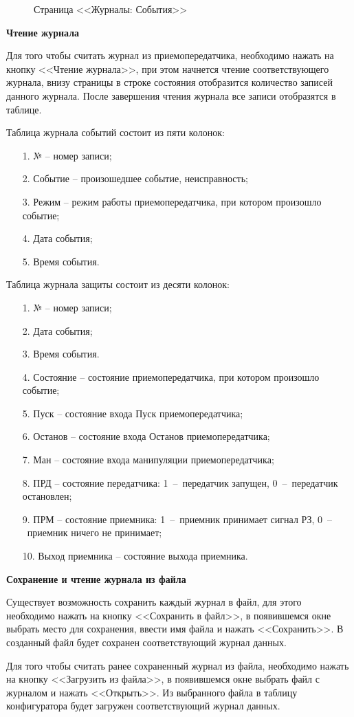 \begin{figure}[H]
	
	\caption{Страница <<Журналы: События>>}
	\label{fig:configurator_journal}
\end{figure}

\textbf{Чтение журнала}

Для того чтобы считать журнал из приемопередатчика, необходимо нажать на кнопку <<Чтение журнала>>, при этом начнется чтение соответствующего журнала, внизу страницы в строке состояния отобразится количество записей данного журнала. После завершения чтения журнала все записи отобразятся в таблице.

Таблица журнала событий состоит из пяти колонок:
\begin{enumerate}
	\item[1.] № – номер записи;
	\item[2.] Событие – произошедшее событие, неисправность;
	\item[3.] Режим – режим работы приемопередатчика, при котором произошло событие;
	\item[4.] Дата события;
	\item[5.] Время события.
\end{enumerate}

Таблица журнала защиты состоит из десяти колонок:
\begin{enumerate}
	\item[1.] № – номер записи;
	\item[2.] Дата события;
	\item[3.] Время события.
	\item[4.] Состояние – состояние приемопередатчика, при котором произошло событие;
	\item[5.] Пуск – состояние входа Пуск приемопередатчика;
	\item[6.] Останов – состояние входа Останов приемопередатчика;
	\item[7.] Ман – состояние входа манипуляции приемопередатчика;
	\item[8.] ПРД – состояние передатчика: 1~–~передатчик запущен, 0~–~передатчик остановлен;
	\item[9.] ПРМ – состояние приемника: 1~–~приемник принимает сигнал РЗ, 0~–~приемник ничего не принимает;
	\item[10.] Выход приемника – состояние выхода приемника.
\end{enumerate}
	
\textbf{Сохранение и чтение журнала из файла}

Существует возможность сохранить каждый журнал в файл, для этого необходимо нажать на кнопку <<Сохранить в файл>>, в появившемся окне выбрать место для сохранения, ввести имя файла и нажать <<Сохранить>>. В созданный файл будет сохранен соответствующий журнал данных. 

Для того чтобы считать ранее сохраненный журнал из файла, необходимо нажать на кнопку <<Загрузить из файла>>, в появившемся окне выбрать файл с журналом и нажать <<Открыть>>. Из выбранного файла в таблицу конфигуратора будет загружен соответствующий журнал данных.
